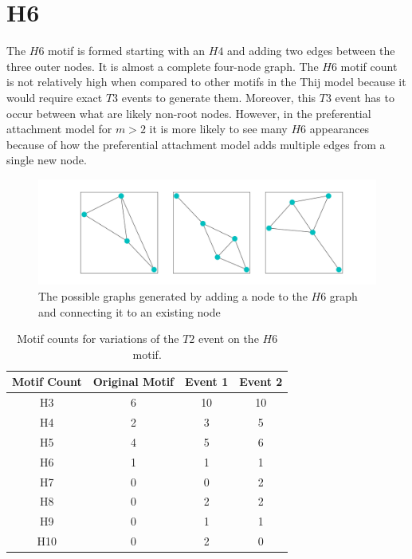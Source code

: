 \section{H6}
The $H6$ motif is formed starting with an $H4$ and adding two edges between the three outer nodes. It is 
almost a complete four-node graph. 
The $H6$ motif count is not relatively high when compared to other motifs in the Thij
model because it would require exact $T3$ events to generate them. Moreover, this
$T3$ event has to occur between what are likely non-root nodes. However, in the preferential attachment model for $m>2$
it is more likely to see many $H6$ appearances because of how 
the preferential attachment model adds multiple edges from a single new node.

\begin{figure}[!ht]
    \includegraphics[width=14cm]{Images/H6_evolution.png}
    \centering
    \caption{The possible graphs generated by adding a node to the $H6$ graph 
    and connecting it to an existing node}
\end{figure}
\FloatBarrier

\begin{table}
    \centering
    \begin{tabular}{||c c c c||} 
    \hline
    Motif Count & Original Motif & Event 1 & Event 2\\ [0.5ex] 
    \hline\hline
    H3 & 6 & 10 & 10\\ 
    \hline
    H4 & 2 & 3 & 5\\
    \hline
    H5 & 4 & 5 & 6\\
    \hline
    H6 & 1 & 1 & 1\\
    \hline
    H7 & 0 & 0 & 2\\
    \hline
    H8 & 0 & 2 & 2\\
    \hline
    H9 & 0 & 1 & 1\\
    \hline
    H10 & 0 & 2 & 0\\
    \hline
   \end{tabular}
   \caption{Motif counts for variations of the $T2$ event on the $H6$ motif.}
    \label{table:4}
\end{table}


